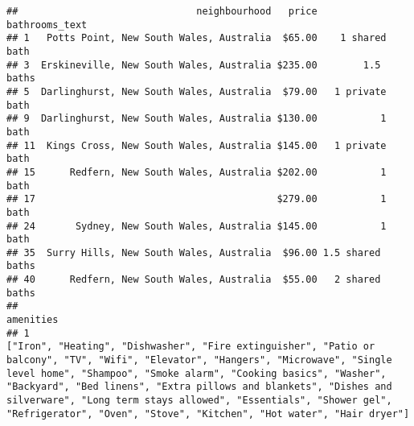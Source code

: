 \documentclass[
]{article}
\begin{document}
\begin{verbatim}
##                               neighbourhood   price   bathrooms_text
## 1   Potts Point, New South Wales, Australia  $65.00    1 shared bath
## 3  Erskineville, New South Wales, Australia $235.00        1.5 baths
## 5  Darlinghurst, New South Wales, Australia  $79.00   1 private bath
## 9  Darlinghurst, New South Wales, Australia $130.00           1 bath
## 11  Kings Cross, New South Wales, Australia $145.00   1 private bath
## 15      Redfern, New South Wales, Australia $202.00           1 bath
## 17                                          $279.00           1 bath
## 24       Sydney, New South Wales, Australia $145.00           1 bath
## 35  Surry Hills, New South Wales, Australia  $96.00 1.5 shared baths
## 40      Redfern, New South Wales, Australia  $55.00   2 shared baths
##                                                                                                                                                                                                                                                                                                                                                                                                                                                                                                                                                                                                                                                                                                                                                                                                                                                                                                                                                                                                                                      amenities
## 1                                                                                                                                                                                                                                                                                                                                                                                                                                                                                                                                                                                                                       ["Iron", "Heating", "Dishwasher", "Fire extinguisher", "Patio or balcony", "TV", "Wifi", "Elevator", "Hangers", "Microwave", "Single level home", "Shampoo", "Smoke alarm", "Cooking basics", "Washer", "Backyard", "Bed linens", "Extra pillows and blankets", "Dishes and silverware", "Long term stays allowed", "Essentials", "Shower gel", "Refrigerator", "Oven", "Stove", "Kitchen", "Hot water", "Hair dryer"]

\end{verbatim}
\end{document}
